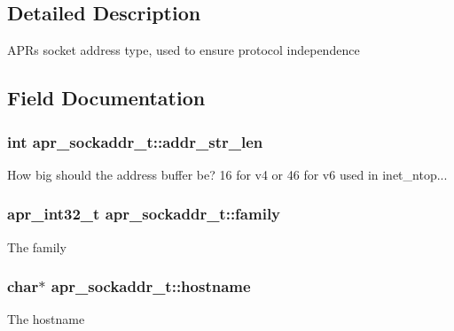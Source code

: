 \subsection{Detailed Description}
A\+P\+Rs socket address type, used to ensure protocol independence 

\subsection{Field Documentation}
\subsubsection[{\texorpdfstring{addr\+\_\+str\+\_\+len}{addr_str_len}}]{\setlength{\rightskip}{0pt plus 5cm}int apr\+\_\+sockaddr\+\_\+t\+::addr\+\_\+str\+\_\+len}\hypertarget{structapr__sockaddr__t_a8f7cda5562e904a1398ed5a4a6f0a9d9}{}\label{structapr__sockaddr__t_a8f7cda5562e904a1398ed5a4a6f0a9d9}
How big should the address buffer be? 16 for v4 or 46 for v6 used in inet\+\_\+ntop... 
\subsubsection[{\texorpdfstring{family}{family}}]{\setlength{\rightskip}{0pt plus 5cm}apr\+\_\+int32\+\_\+t apr\+\_\+sockaddr\+\_\+t\+::family}\hypertarget{structapr__sockaddr__t_ac17f6e803928cfc29069a6e62dcb3a52}{}\label{structapr__sockaddr__t_ac17f6e803928cfc29069a6e62dcb3a52}
The family 
\subsubsection[{\texorpdfstring{hostname}{hostname}}]{\setlength{\rightskip}{0pt plus 5cm}char$\ast$ apr\+\_\+sockaddr\+\_\+t\+::hostname}\hypertarget{structapr__sockaddr__t_a8e675775b407f25674aaa938a40de9cd}{}\label{structapr__sockaddr__t_a8e675775b407f25674aaa938a40de9cd}
The hostname 
